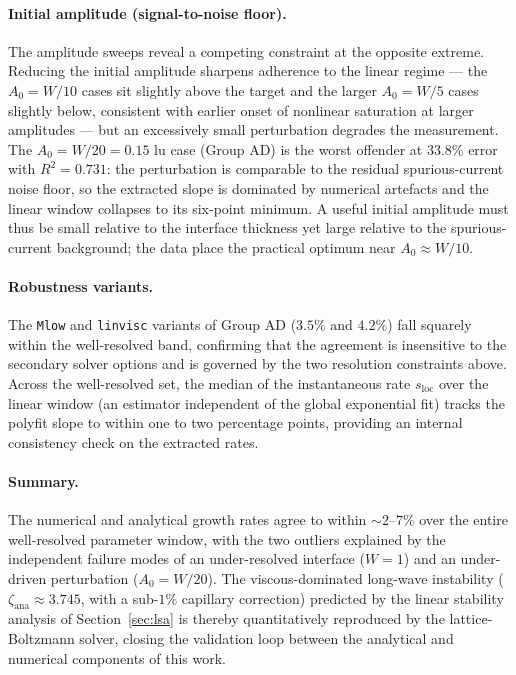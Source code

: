 \paragraph{Initial amplitude (signal-to-noise floor).} The amplitude sweeps reveal a competing constraint at the opposite extreme. Reducing the initial amplitude sharpens adherence to the linear regime --- the $A_0 = W/10$ cases sit slightly above the target and the larger $A_0 = W/5$ cases slightly below, consistent with earlier onset of nonlinear saturation at larger amplitudes --- but an excessively small perturbation degrades the measurement. The $A_0 = W/20 = 0.15$ lu case (Group AD) is the worst offender at $33.8\%$ error with $R^2 = 0.731$: the perturbation is comparable to the residual spurious-current noise floor, so the extracted slope is dominated by numerical artefacts and the linear window collapses to its six-point minimum. A useful initial amplitude must thus be small relative to the interface thickness yet large relative to the spurious-current background; the data place the practical optimum near $A_0 \approx W/10$.

\paragraph{Robustness variants.} The \texttt{Mlow} and \texttt{linvisc} variants of Group AD ($3.5\%$ and $4.2\%$) fall squarely within the well-resolved band, confirming that the agreement is insensitive to the secondary solver options and is governed by the two resolution constraints above. Across the well-resolved set, the median of the instantaneous rate $s_{\mathrm{loc}}$ over the linear window (an estimator independent of the global exponential fit) tracks the polyfit slope to within one to two percentage points, providing an internal consistency check on the extracted rates.

\paragraph{Summary.} The numerical and analytical growth rates agree to within $\sim\!2$--$7\%$ over the entire well-resolved parameter window, with the two outliers explained by the independent failure modes of an under-resolved interface ($W=1$) and an under-driven perturbation ($A_0 = W/20$). The viscous-dominated long-wave instability ($\zeta_{\mathrm{ana}} \approx 3.745$, with a sub-$1\%$ capillary correction) predicted by the linear stability analysis of Section~\ref{sec:lsa} is thereby quantitatively reproduced by the lattice-Boltzmann solver, closing the validation loop between the analytical and numerical components of this work.
